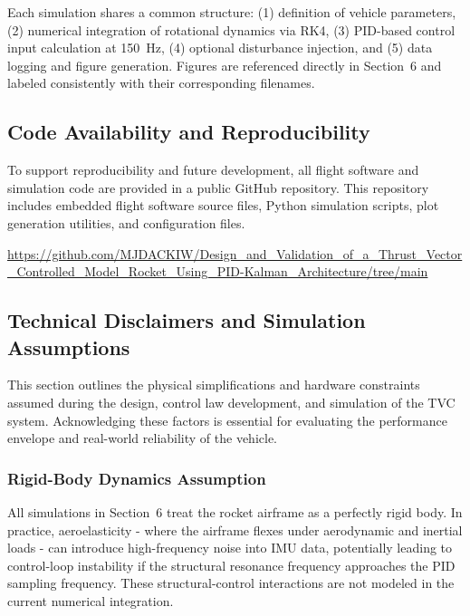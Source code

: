 Each simulation shares a common structure: (1) definition of vehicle parameters, (2) numerical
integration of rotational dynamics via RK4, (3) PID-based control input calculation at 150~Hz,
(4) optional disturbance injection, and (5) data logging and figure generation. Figures are
referenced directly in Section~6 and labeled consistently with their corresponding filenames.

\subsection{Code Availability and Reproducibility}
\label{subsec:app_code}

To support reproducibility and future development, all flight software and simulation code are
provided in a public GitHub repository. This repository includes embedded flight software source
files, Python simulation scripts, plot generation utilities, and configuration files.

\url{https://github.com/MJDACKIW/Design_and_Validation_of_a_Thrust_Vector_Controlled_Model_Rocket_Using_PID-Kalman_Architecture/tree/main}

\subsection{Technical Disclaimers and Simulation Assumptions}
\label{subsec:app_disclaimers}

This section outlines the physical simplifications and hardware constraints assumed during the
design, control law development, and simulation of the TVC system. Acknowledging these factors
is essential for evaluating the performance envelope and real-world reliability of the vehicle.

\subsubsection{Rigid-Body Dynamics Assumption}

All simulations in Section~6 treat the rocket airframe as a perfectly rigid body. In practice,
aeroelasticity - where the airframe flexes under aerodynamic and inertial loads - can introduce
high-frequency noise into IMU data, potentially leading to control-loop instability if the
structural resonance frequency approaches the PID sampling frequency. These structural-control
interactions are not modeled in the current numerical integration.

